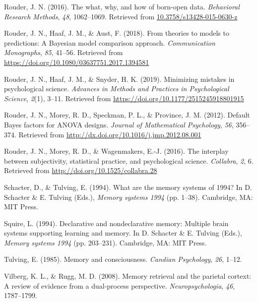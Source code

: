 \documentclass[english,,man,floatsintext]{apa6}
\begin{document}
\leavevmode\hypertarget{ref-Rouder:2016}{}%
Rouder, J. N. (2016). The what, why, and how of born-open data. \emph{Behavioral Research Methods}, \emph{48}, 1062--1069. Retrieved from \url{10.3758/s13428-015-0630-z}

\leavevmode\hypertarget{ref-Rouder:etal:2018}{}%
Rouder, J. N., Haaf, J. M., \& Aust, F. (2018). From theories to models to predictions: A Bayesian model comparison approach. \emph{Communication Monographs}, \emph{85}, 41--56. Retrieved from \url{https://doi.org/10.1080/03637751.2017.1394581}

\leavevmode\hypertarget{ref-Rouder:etal:2019a}{}%
Rouder, J. N., Haaf, J. M., \& Snyder, H. K. (2019). Minimizing mistakes in psychological science. \emph{Advances in Methods and Practices in Psychological Science}, \emph{2}(1), 3--11. Retrieved from \url{https://doi.org/10.1177/2515245918801915}

\leavevmode\hypertarget{ref-Rouder:etal:2012}{}%
Rouder, J. N., Morey, R. D., Speckman, P. L., \& Province, J. M. (2012). Default Bayes factors for ANOVA designs. \emph{Journal of Mathematical Psychology}, \emph{56}, 356--374. Retrieved from \url{http://dx.doi.org/10.1016/j.jmp.2012.08.001}

\leavevmode\hypertarget{ref-Rouder:etal:2016b}{}%
Rouder, J. N., Morey, R. D., \& Wagenmakers, E.-J. (2016). The interplay between subjectivity, statistical practice, and psychological science. \emph{Collabra}, \emph{2}, 6. Retrieved from \url{http://doi.org/10.1525/collabra.28}

\leavevmode\hypertarget{ref-Schacter:Tulving:1994}{}%
Schacter, D., \& Tulving, E. (1994). What are the memory systems of 1994? In D. Schacter \& E. Tulving (Eds.), \emph{Memory systems 1994} (pp. 1--38). Cambridge, MA: MIT Press.

\leavevmode\hypertarget{ref-Squire:1994}{}%
Squire, L. (1994). Declarative and nondeclarative memory: Multiple brain systems supporting learning and memory. In D. Schacter \& E. Tulving (Eds.), \emph{Memory systems 1994} (pp. 203--231). Cambridge, MA: MIT Press.

\leavevmode\hypertarget{ref-Tulving:1985}{}%
Tulving, E. (1985). Memory and consciousness. \emph{Candian Psychology}, \emph{26}, 1--12.

\leavevmode\hypertarget{ref-Vilberg:Rugg:2008}{}%
Vilberg, K. L., \& Rugg, M. D. (2008). Memory retrieval and the parietal cortext: A review of evidence from a dual-process perspective. \emph{Neuropsychologia}, \emph{46}, 1787--1799.
\end{document}
